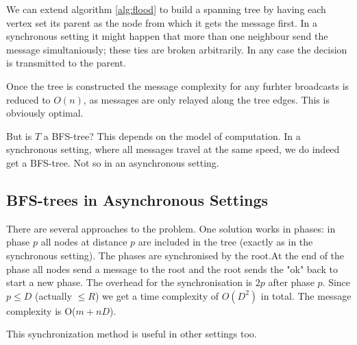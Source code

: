We can extend algorithm \ref{alg:flood} to build a spanning tree by having each vertex set its parent as the node from which it gets the message first. In a synchronous setting it might happen that more than one neighbour send the message simultaniously; these ties are broken arbitrarily. In any case the decision is transmitted to the parent.

Once the tree is constructed the message complexity for any furhter broadcasts is reduced to $O(n)$, as messages are only relayed along the tree edges. This is obviously optimal.

But is $T$ a BFS-tree? This depends on the model of computation. In a synchronous setting, where all messages travel at the same speed, we do indeed get a BFS-tree. Not so in an asynchronous setting.

\subsection{BFS-trees in Asynchronous Settings}

There are several approaches to the problem. One solution works in phases: in phase $p$ all nodes at distance $p$ are included in the tree (exactly as in the synchronous setting). The phases are synchronised by the root.At the end of the phase all nodes send a message to the root and the root sends the "ok" back to start a new phase. The overhead for the synchronisation is $2p$ after phase $p$. Since $p\leq D$ (actually $\leq R$) we get a time complexity of $O(D^2)$ in total. The message complexity is O($m+nD$).

This synchronization method is useful in other settings too.